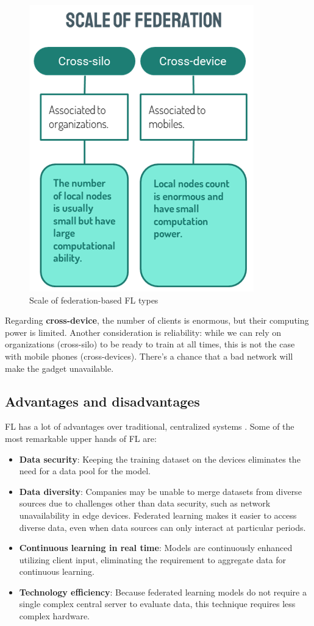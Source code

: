 \begin{figure}[H]
\centering
\includegraphics[scale=0.5]{img/fl_scale.png}
\caption{Scale of federation-based FL types}
\label{fig:fl_scale}
\end{figure}

Regarding \textbf{cross-device}, the number of clients is enormous, but their computing power is limited. Another consideration is reliability: while we can rely on organizations (cross-silo) to be ready to train at all times, this is not the case with mobile phones (cross-devices). There's a chance that a bad network will make the gadget unavailable.

\subsection{Advantages and disadvantages}

FL has a lot of advantages over traditional, centralized systems \cite{fl27_adv_disadv}. Some of the most remarkable upper hands of FL are:

\begin{itemize}
    \item \textbf{Data security}: Keeping the training dataset on the devices eliminates the need for a data pool for the model.
    \item \textbf{Data diversity}: Companies may be unable to merge datasets from diverse sources due to challenges other than data security, such as network unavailability in edge devices. Federated learning makes it easier to access diverse data, even when data sources can only interact at particular periods.
    \item \textbf{Continuous learning in real time}: Models are continuously enhanced utilizing client input, eliminating the requirement to aggregate data for continuous learning.
    \item \textbf{Technology efficiency}: Because federated learning models do not require a single complex central server to evaluate data, this technique requires less complex hardware.
\end{itemize}

